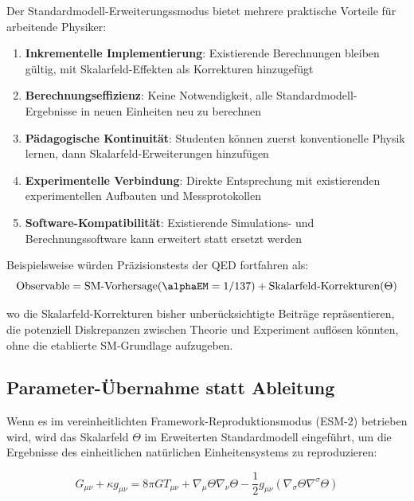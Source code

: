 	Der Standardmodell-Erweiterungssmodus bietet mehrere praktische Vorteile für arbeitende Physiker:
	
	\begin{enumerate}
		\item \textbf{Inkrementelle Implementierung}: Existierende Berechnungen bleiben gültig, mit Skalarfeld-Effekten als Korrekturen hinzugefügt
		\item \textbf{Berechnungseffizienz}: Keine Notwendigkeit, alle Standardmodell-Ergebnisse in neuen Einheiten neu zu berechnen
		\item \textbf{Pädagogische Kontinuität}: Studenten können zuerst konventionelle Physik lernen, dann Skalarfeld-Erweiterungen hinzufügen
		\item \textbf{Experimentelle Verbindung}: Direkte Entsprechung mit existierenden experimentellen Aufbauten und Messprotokollen
		\item \textbf{Software-Kompatibilität}: Existierende Simulations- und Berechnungssoftware kann erweitert statt ersetzt werden
	\end{enumerate}
	
	Beispielsweise würden Präzisionstests der QED fortfahren als:
	\begin{equation}
		\text{Observable} = \text{SM-Vorhersage}(\alphaEM = 1/137) + \text{Skalarfeld-Korrekturen}(\Theta)
	\end{equation}
	
	wo die Skalarfeld-Korrekturen bisher unberücksichtigte Beiträge repräsentieren, die potenziell Diskrepanzen zwischen Theorie und Experiment auflösen könnten, ohne die etablierte SM-Grundlage aufzugeben.
	
	\subsection{Parameter-Übernahme statt Ableitung}
	\label{subsec:parameter_adoption}
	
	Wenn es im vereinheitlichten Framework-Reproduktionsmodus (ESM-2) betrieben wird, wird das Skalarfeld $\Theta$ im Erweiterten Standardmodell eingeführt, um die Ergebnisse des einheitlichen natürlichen Einheitensystems zu reproduzieren:
	
	\begin{equation}
		G_{\mu\nu} + \kappa g_{\mu\nu} = 8\pi G T_{\mu\nu} + \nabla_{\mu}\Theta\nabla_{\nu}\Theta - \frac{1}{2}g_{\mu\nu}(\nabla_{\sigma}\Theta\nabla^{\sigma}\Theta)
	\end{equation}
	
